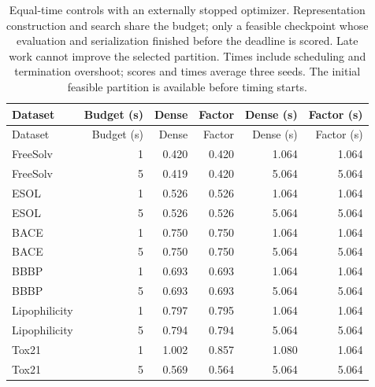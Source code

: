 \begin{longtable}{lrrrrr}
\caption{Equal-time controls with an externally stopped optimizer. Representation construction and search share the budget; only a feasible checkpoint whose evaluation and serialization finished before the deadline is scored. Late work cannot improve the selected partition. Times include scheduling and termination overshoot; scores and times average three seeds. The initial feasible partition is available before timing starts.}\\
\toprule
Dataset & Budget (s) & Dense & Factor & Dense (s) & Factor (s)\\\midrule
\endfirsthead
\toprule
Dataset & Budget (s) & Dense & Factor & Dense (s) & Factor (s)\\\midrule
\endhead
\midrule\endfoot
\bottomrule\endlastfoot
FreeSolv & 1 & 0.420 & 0.420 & 1.064 & 1.064\\
FreeSolv & 5 & 0.419 & 0.420 & 5.064 & 5.064\\
ESOL & 1 & 0.526 & 0.526 & 1.064 & 1.064\\
ESOL & 5 & 0.526 & 0.526 & 5.064 & 5.064\\
BACE & 1 & 0.750 & 0.750 & 1.064 & 1.064\\
BACE & 5 & 0.750 & 0.750 & 5.064 & 5.064\\
BBBP & 1 & 0.693 & 0.693 & 1.064 & 1.064\\
BBBP & 5 & 0.693 & 0.693 & 5.064 & 5.064\\
Lipophilicity & 1 & 0.797 & 0.795 & 1.064 & 1.064\\
Lipophilicity & 5 & 0.794 & 0.794 & 5.064 & 5.064\\
Tox21 & 1 & 1.002 & 0.857 & 1.080 & 1.064\\
Tox21 & 5 & 0.569 & 0.564 & 5.064 & 5.064\\
\end{longtable}
